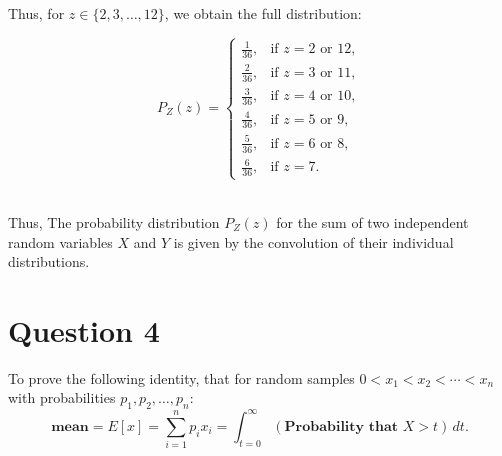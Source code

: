 \documentclass[12pt]{article}
\begin{document}
Thus, for \( z \in \{2, 3, \dots, 12\} \), we obtain the full distribution:

\[
P_Z(z) = 
\begin{cases} 
\frac{1}{36}, & \text{if } z = 2 \text{ or } 12, \\
\frac{2}{36}, & \text{if } z = 3 \text{ or } 11, \\
\frac{3}{36}, & \text{if } z = 4 \text{ or } 10, \\
\frac{4}{36}, & \text{if } z = 5 \text{ or } 9, \\
\frac{5}{36}, & \text{if } z = 6 \text{ or } 8, \\
\frac{6}{36}, & \text{if } z =  7.
\end{cases}
\]

\\

Thus, The probability distribution \( P_Z(z) \) for the sum of two independent random variables \( X \) and \( Y \) is given by the convolution of their individual distributions.

\section*{Question 4}

To prove the following identity, that for random samples \( 0 < x_1 < x_2 < \cdots < x_n \) with probabilities \( p_1, p_2, \dots, p_n \):
\[
\textbf{mean} = E[x] = \sum_{i=1}^{n} p_i x_i = \int_{t=0}^{\infty} (\textbf{Probability that } X > t) \, dt.
\]
\end{document}
